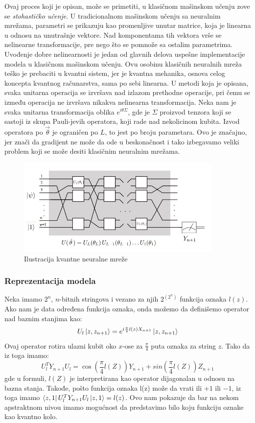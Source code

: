 \documentclass[12pt, letterpaper, oneside]{article}
\begin{document}
Ovaj proces koji je opisan, može se primetiti, u klasičnom mašinskom učenju zove se \textit{stohastičko učenje}.
U tradicionalnom mašinskom učenju sa neuralnim mrežama, parametri se prikazuju kao promenljive unutar matrice, koja je linearna u odnosu na unutrašnje vektore.
Nad komponentama tih vektora vrše se nelinearne transformacije, pre nego što se pomnože sa ostalim parametrima. 
Uvođenje dobre nelinearnosti je jedan od glavnih delova uspešne implementacije modela u klasičnom mašinskom učenju.
Ovu osobinu klasičnih neuralnih mreža teško je prebaciti u kvantni sistem, jer je kvantna mehanika, osnova celog koncepta kvantnog računarstva, sama po sebi linearna.
U metodi koja je opisana, svaka unitarna operacija se izvršava nad izlazom prethodne operacije, pri čemu se između operacija ne izvršava nikakva nelinearna transformacija.
Neka nam je svaka unitarna transformacija oblika $e^{i\theta\Sigma}$, gde je $\Sigma$ proizvod tenzora koji se sastoji iz skupa Pauli-jevih operatora, koji rade nad nekolicinom kubita.
Izvod operatora po $\overrightarrow{\theta}$ je ograničen po $L$, to jest po broju parametara. Ovo je značajno, jer znači da gradijent ne može da ode u beskonačnost i tako izbegavamo 
veliki problem koji se može desiti klasičnim neuralnim mrežama.

\begin{figure}[ht]
    \centering
    \includegraphics[width=0.9\textwidth]{files/QNN.jpg}
    \caption{Ilustracija kvantne neuralne mreže \cite{Classification_wit_QNN}}
\end{figure}

\subsubsection{Reprezentacija modela}
Neka imamo $2^n$, $n$-bitnih stringova i vezano za njih $2^{(2^n)}$ funkcija oznaka $l(z)$.
Ako nam je data određena funkcija oznaka, onda možemo da definišemo operator nad baznim stanjima kao:
\[
    U_l\Ket{z,z_{n+1}} = e^{i\frac{\pi}{4}l(z)X_{n+1}}\Ket{z,z_{n+1}}
\]
Ovaj operator rotira ulazni kubit oko $x$-ose za $\frac{\pi}{4}$ puta oznaka za string $z$.
Tako da iz toga imamo:
\[
    U_l^TY_{n+1}U_l = \cos(\frac{\pi}{4}l(Z))Y_{n+1} + sin(\frac{\pi}{4}l(Z))Z_{n+1}
\]
gde u formuli, $l(Z)$ je interpretirana kao operator dijagonalan u odnosu na bazna stanja.
Takođe, pošto funkcija oznaka l(z) može da vrati ili $+1$ ili $-1$, iz toga imamo $\bra{z,1}U_l^TY_{n+1}U_l\ket{z,1} = l(z)$.
Ovo nam pokazuje da bar na nekom apstraktnom nivou imamo mogućnost da predstavimo bilo koju funkciju oznake kao kvantno kolo.
\end{document}
